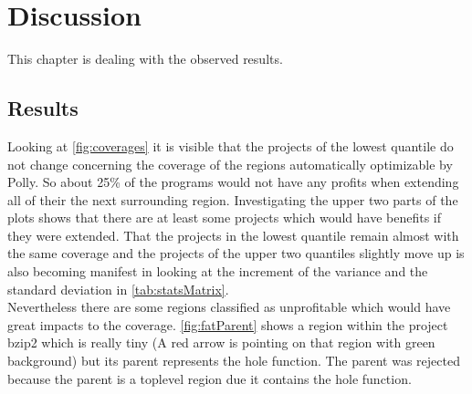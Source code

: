 \chapter{Discussion}
This chapter is dealing with the observed results.

\section{Results}
Looking at \autoref{fig:coverages} it is visible that the projects of the lowest quantile do not change concerning the coverage of the regions automatically optimizable by Polly.
So about 25\% of the programs would not have any profits when extending all of their \scops the next surrounding region.
Investigating the upper two parts of the plots shows that there are at least some projects which would have benefits if they were extended.
That the projects in the lowest quantile remain almost with the same coverage and the projects of the upper two quantiles slightly move up is also becoming manifest in looking at the increment of the variance and the standard deviation in \autoref{tab:statsMatrix}.\\
Nevertheless there are some regions classified as unprofitable which would have great impacts to the coverage.
\autoref{fig:fatParent} shows a region within the project bzip2 which is really tiny (A red arrow is pointing on that region with green background) but its parent represents the hole function.
The parent was rejected because the parent is a toplevel region due it contains the hole function.
